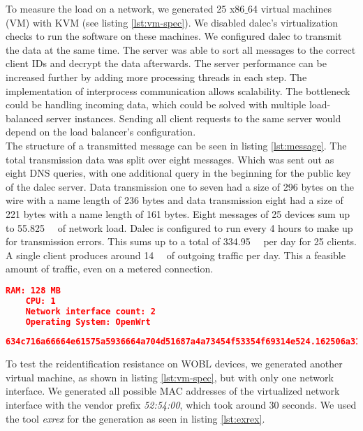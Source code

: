     To measure the load on a network, we generated 25 x86$\_$64 virtual machines (VM) with KVM (see listing \ref{lst:vm-spec}). We disabled dalec's virtualization checks to run the software on these machines. We configured dalec to transmit the data at the same time. The server was able to sort all messages to the correct client IDs and decrypt the data afterwards. The server performance can be increased further by adding more processing threads in each step. The implementation of interprocess communication allows scalability. The bottleneck could be handling incoming data, which could be solved with multiple load-balanced server instances. Sending all client requests to the same server would depend on the load balancer's configuration.\\
    The structure of a transmitted message can be seen in listing \ref{lst:message}. The total transmission data was split over eight messages.
    Which was sent out as eight DNS queries, with one additional query in the beginning for the public key of the dalec server.
    Data transmission one to seven had a size of 296 bytes on the wire with a name length of 236 bytes and data transmission eight had a size of 221 bytes with a name length of 161 bytes. Eight messages of  25 devices sum up to \SIlist{55.825}{\kilo\byte} of network load. Dalec is configured to run every 4 hours to make up for transmission errors. 
    This sums up to a total of \SIlist{334.95}{\kilo\byte} per day for 25 clients. 
    A single client produces around \SIlist{14}{\kilo\byte} of outgoing traffic per day.
    This a feasible amount of traffic, even on a metered connection.
    
    \begin{lstlisting}[language=json, caption=virtual machine specifications, label=lst:vm-spec]
    RAM: 128 MB
    CPU: 1
    Network interface count: 2
    Operating System: OpenWrt
    \end{lstlisting}

    \begin{lstlisting}[language=json, caption=Layout of dalec message, label=lst:message]
634c716a66664e61575a5936664a704d51687a4a73454f53354f69314e524.162506a310a636136794752496d36794c5352626a6a464d765532636f4835.7258694279492b6b714c65507138426667596a31382b597a756d544267643.EPfGiM9IJpDHQQMaItynBRlJpusUP0KA-7-8.owrt.sviks.de
    \end{lstlisting}    
    
    To test the reidentification resistance on WOBL devices, we generated another virtual machine, as shown in listing \ref{lst:vm-spec}, but with only one network interface. 
    We generated all possible MAC addresses of the virtualized network interface with the vendor prefix \textit{52:54:00}, which took around 30 seconds. We used the tool \textit{exrex} \cite{tauber_asciimooexrex_2021} for the generation as seen in listing \ref{lst:exrex}. 
    
